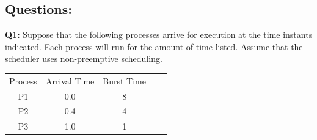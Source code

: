 \documentclass[a4paper]{article}
\newcommand{\tf}{\textbf}
\begin{document}
\subsection{Questions: }

\tf{Q1:} Suppose that the following processes arrive for execution at the time instants indicated. Each process
will run for the amount of time listed. Assume that the scheduler uses non-preemptive scheduling.\\

    \begin{table}[h!]
        \centering
        \begin{tabular}{c|c|cll}
        Process & Arrival Time & Burst Time &  &  \\ \cline{1-3}
        P1      & 0.0          & 8          &  &  \\
        P2      & 0.4          & 4          &  &  \\
        P3      & 1.0          & 1          &  & 
        \end{tabular}
    \end{table}
\end{document}
